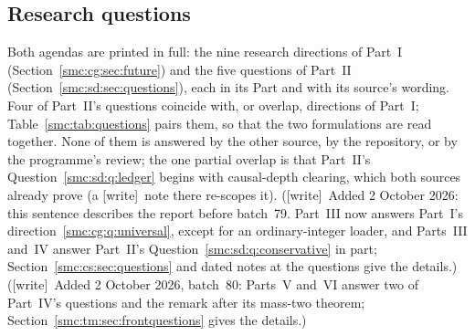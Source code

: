 \documentclass[11pt,letterpaper]{article}
\numberwithin{equation}{section}
\theoremstyle{definition}
\theoremstyle{remark}
\newcommand{\wtag}{\textup{[write]}}
\begin{document}
\subsection{Research questions}\label{smc:sec:questions}

Both agendas are printed in full: the nine research directions of Part~I (Section~\ref{smc:cg:sec:future}) and the five questions of Part~II (Section~\ref{smc:sd:sec:questions}), each in its Part and with its source's wording. Four of Part~II's questions coincide with, or overlap, directions of Part~I; Table~\ref{smc:tab:questions} pairs them, so that the two formulations are read together. None of them is answered by the other source, by the repository, or by the programme's review; the one partial overlap is that Part~II's Question~\ref{smc:sd:q:ledger} begins with causal-depth clearing, which both sources already prove (a \wtag\ note there re-scopes it). (\wtag\ Added 2 October 2026: this sentence describes the report before batch~79. Part~III now answers Part~I's direction~\ref{smc:cg:q:universal}, except for an ordinary-integer loader, and Parts~III and~IV answer Part~II's Question~\ref{smc:sd:q:conservative} in part; Section~\ref{smc:cs:sec:questions} and dated notes at the questions give the details.) (\wtag\ Added 2 October 2026, batch~80: Parts~V and~VI answer two of Part~IV's questions and the remark after its mass-two theorem; Section~\ref{smc:tm:sec:frontquestions} gives the details.)
\end{document}
